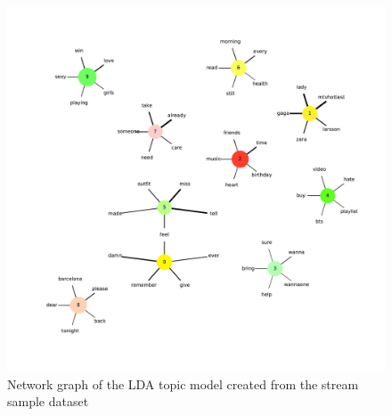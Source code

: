 \begin{figure}
    \centering
    \caption{Network graph of the LDA topic model created from the stream sample dataset}
    \label{fig:combined_network_graph}
    \includegraphics[width=\textwidth]{../figures/combined_network_graph.pdf}
\end{figure}